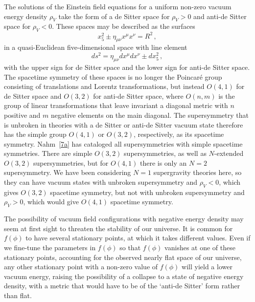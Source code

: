 The solutions of the Einstein field equations for a uniform non-zero vacuum
energy density \(\rho_V\) take the form of a de Sitter space for
\(\rho_V>0\) and anti-de Sitter space for \(\rho_V<0\). These spaces may be
described as the surfaces
\begin{equation}
  x_5^2\mathbin{\pm}\eta_{\mu\nu}x^\mu x^\nu=R^2\,,
  \tag{31.2.21}\label{eq:31.2.21}
\end{equation}
in a quasi-Euclidean five-dimensional space with line element
\begin{equation}
  ds^2=\eta_{\mu\nu}dx^\mu dx^\nu\mathbin{\pm}dx_5^2\,,
  \tag{31.2.22}\label{eq:31.2.22}
\end{equation}
with the upper sign for de Sitter space and the lower sign for anti-de Sitter
space. The spacetime symmetry of these spaces is no longer the Poincaré group
consisting of translations and Lorentz transformations, but instead \(O(4,1)\)
for de Sitter space and \(O(3,2)\) for anti-de Sitter space, where \(O(n,m)\)
is the group of linear transformations that leave invariant a diagonal metric
with \(n\) positive and \(m\) negative elements on the main diagonal. The
supersymmetry that is unbroken in theories with a de Sitter or anti-de Sitter
vacuum state therefore has the simple group \(O(4,1)\) or \(O(3,2)\),
respectively, as its spacetime symmetry. Nahm~\hyperref[ch31-ref-7a]{[7a]} has
cataloged all supersymmetries with simple spacetime symmetries. There are
simple \(O(3,2)\) supersymmetries, as well as \(N\)-extended \(O(3,2)\)
supersymmetries, but for \(O(4,1)\) there is only an \(N=2\) supersymmetry. We
have been considering \(N=1\) supergravity theories here, so they can have
vacuum states with unbroken supersymmetry and \(\rho_V<0\), which gives
\(O(3,2)\) spacetime symmetry, but not with unbroken supersymmetry and
\(\rho_V>0\), which would give \(O(4,1)\) spacetime symmetry.

The possibility of vacuum field configurations with negative energy density
may seem at first sight to threaten the stability of our universe. It is
common for \(f(\phi)\) to have several stationary points, at which it takes
different values. Even if we fine-tune the parameters in \(f(\phi)\) so that
\(f(\phi)\) vanishes at one of these stationary points, accounting for the
observed nearly flat space of our universe, any other stationary point with a
non-zero value of \(f(\phi)\) will yield a lower vacuum energy, raising the
possibility of a collapse to a state of negative energy density, with a metric
that would have to be of the `anti-de Sitter' form rather than flat.

